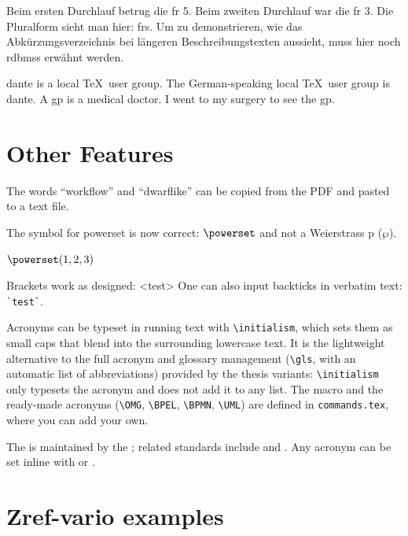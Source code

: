 \documentclass[../thesis-example]{subfiles}
\begin{document}
\begin{ltgexample}
Beim ersten Durchlauf betrug die \gls{fr} 5.
Beim zweiten Durchlauf war die \gls{fr} 3.
Die Pluralform sieht man hier: \glspl{fr}.
Um zu demonstrieren, wie das Abkürzungsverzeichnis bei längeren Beschreibungstexten aussieht, muss hier noch \glspl{rdbms} erwähnt werden.

\gls{dante} is a local \TeX\ user group.
The German-speaking local \TeX\ user group is \gls{dante}.
A \gls{gp} is a medical doctor.
I went to my surgery to see the \gls{gp}.
\end{ltgexample}

\section{Other Features}

\begin{ltgexample}
The words \enquote{workflow} and \enquote{dwarflike} can be copied from the PDF and pasted to a text file.
\end{ltgexample}

\begin{ltgexample}
The symbol for powerset is now correct: $\powerset$ and not a Weierstrass p ($\wp$).

$\powerset({1,2,3})$
\end{ltgexample}

\begin{ltgexample}
Brackets work as designed:
<test>
One can also input backticks in verbatim text: \verb|`test`|.
\end{ltgexample}

Acronyms can be typeset in running text with \verb+\initialism+, which sets them as small caps that blend into the surrounding lowercase text. It is the lightweight alternative to the full acronym and glossary management (\verb+\gls+, with an automatic list of abbreviations) provided by the thesis variants: \verb+\initialism+ only typesets the acronym and does not add it to any list. The macro and the ready-made acronyms (\verb+\OMG+, \verb+\BPEL+, \verb+\BPMN+, \verb+\UML+) are defined in \texttt{commands.tex}, where you can add your own.

\begin{ltgexample}
The \UML is maintained by the \OMG; related standards include \BPEL and \BPMN.
Any acronym can be set inline with  or .
\end{ltgexample}


\section{Zref-vario examples}
\label{sec:ex:vref}
\end{document}
